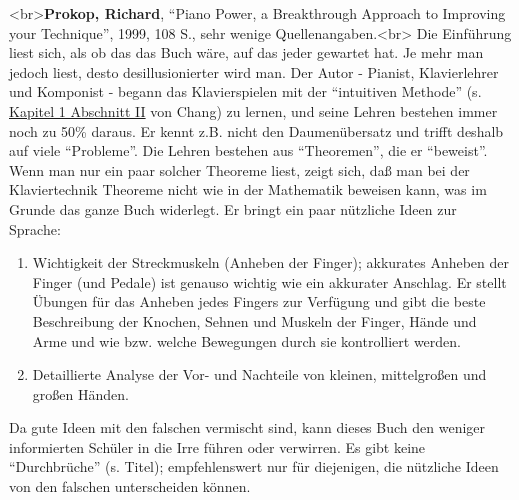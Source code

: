\hypertarget{Prokop}{}

<br>\textbf{Prokop, Richard}, \enquote{Piano Power, a Breakthrough Approach to Improving your Technique}, 1999, 108 S., sehr wenige Quellenangaben.<br>
Die Einführung liest sich, als ob das das Buch wäre, auf das jeder gewartet hat.
Je mehr man jedoch liest, desto desillusionierter wird man.
Der Autor - Pianist, Klavierlehrer und Komponist - begann das Klavierspielen mit der \enquote{intuitiven Methode} (s. \hyperlink{c1ii1}{Kapitel 1 Abschnitt II} von Chang) zu lernen, und seine Lehren bestehen immer noch zu 50\% daraus.
Er kennt z.B. nicht den Daumenübersatz und trifft deshalb auf viele \enquote{Probleme}.
Die Lehren bestehen aus \enquote{Theoremen}, die er \enquote{beweist}.
Wenn man nur ein paar solcher Theoreme liest, zeigt sich, daß man bei der Klaviertechnik Theoreme nicht wie in der Mathematik beweisen kann, was im Grunde das ganze Buch widerlegt.
Er bringt ein paar nützliche Ideen zur Sprache:

\begin{enumerate} 
 \item Wichtigkeit der Streckmuskeln (Anheben der Finger); akkurates Anheben der Finger (und Pedale) ist genauso wichtig wie ein akkurater Anschlag.
Er stellt Übungen für das Anheben jedes Fingers zur Verfügung und gibt die beste Beschreibung der Knochen, Sehnen und Muskeln der Finger, Hände und Arme und wie bzw. welche Bewegungen durch sie kontrolliert werden.
 \item Detaillierte Analyse der Vor- und Nachteile von kleinen, mittelgroßen und großen Händen.
 \end{enumerate}
Da gute Ideen mit den falschen vermischt sind, kann dieses Buch den weniger informierten Schüler in die Irre führen oder verwirren.
Es gibt keine \enquote{Durchbrüche} (s. Titel); empfehlenswert nur für diejenigen, die nützliche Ideen von den falschen unterscheiden können.


\hypertarget{Richman}{}

